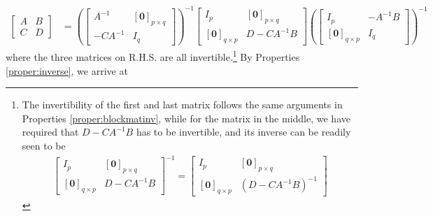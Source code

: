 \begin{align*}
\begin{bmatrix}
A & B \\
C & D
\end{bmatrix}
&= 
\left(\begin{bmatrix}
A^{-1} & [\textbf{0}]_{p\times q} \\
-CA^{-1} & I_q
\end{bmatrix}\right)^{-1}
\begin{bmatrix}
I_p & [\textbf{0}]_{p \times q} \\
[\textbf{0}]_{q\times p} & D - CA^{-1}B 
\end{bmatrix}
\left(\begin{bmatrix}
I_p & -A^{-1}B \\
[\textbf{0}]_{q \times p} & I_q
\end{bmatrix}\right)^{-1}
\end{align*}
where the three matrices on R.H.S. are all invertible.\footnote{The invertibility of the first and last matrix follows the same arguments in Properties \ref{proper:blockmatinv}, while for the matrix in the middle, we have required that $D-CA^{-1}B$ has to be invertible, and its inverse can be readily seen to be
\begin{align*}
\begin{bmatrix}
I_p & [\textbf{0}]_{p \times q} \\
[\textbf{0}]_{q\times p} & D - CA^{-1}B 
\end{bmatrix}^{-1}
=
\begin{bmatrix}
I_p & [\textbf{0}]_{p \times q} \\
[\textbf{0}]_{q\times p} & (D - CA^{-1}B)^{-1}
\end{bmatrix}
\end{align*}} By Properties \ref{proper:inverse}, we arrive at
